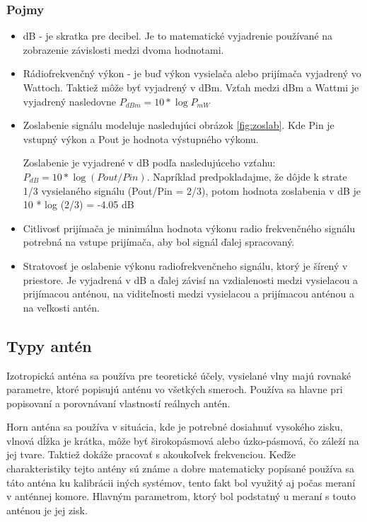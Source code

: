 \documentclass[11pt,twoside,a4paper]{book}
\begin{document}
\subsubsection{Pojmy}
\begin{itemize}
 \item dB - je skratka pre decibel. Je to matematické vyjadrenie používané na zobrazenie závislosti medzi dvoma hodnotami. 
 \item Rádiofrekvenčný výkon - je buď výkon vysielača alebo prijímača vyjadrený vo Wattoch. Taktiež môže byť vyjadrený v dBm. Vzťah medzi dBm a Wattmi je vyjadrený nasledovne $P_{dBm} = 10 * \log P_{mW}$
 \item Zoslabenie signálu modeluje nasledujúci obrázok \ref{fig:zoslab}. Kde Pin je vstupný výkon a Pout je hodnota výstupného výkonu.

 Zoslabenie je vyjadrené v dB podľa nasledujúceho vzťahu: $P_{dB} = 10 * \log(Pout / Pin)$. Napríklad predpokladajme, že dôjde k strate 1/3 vysielaného signálu (Pout/Pin = 2/3), potom hodnota zoslabenia v dB je 10 * log (2/3) = -4.05 dB
 
\item Citlivosť prijímača je minimálna hodnota výkonu radio frekvenčného signálu potrebná na vstupe prijímača, aby bol signál ďalej spracovaný. 

 \item Stratovosť je oslabenie výkonu radiofrekvenčneho signálu, ktorý je šírený v priestore. Je vyjadrená v dB a ďalej závisí na vzdialenosti medzi vysielacou a prijímacou anténou, na viditeľnosti medzi vysielacou a prijímacou anténou a na veľkosti antén.
\end{itemize}

\subsection{Typy antén}
\indent Izotropická anténa sa používa pre teoretické účely, vysielané vlny majú rovnaké parametre, ktoré popisujú anténu vo všetkých smeroch. Používa sa hlavne pri popisovaní a porovnávaní vlastností reálnych antén. 


\noindent Horn anténa sa používa v situácia, kde je potrebné dosiahnuť vysokého zisku, vlnová dĺžka je krátka, môže byť širokopásmová alebo úzko-pásmová, čo záleží na jej tvare. Taktiež dokáže pracovať s akoukoľvek frekvenciou. Keďže charakteristiky tejto antény sú známe a dobre matematicky popísané používa sa táto anténa ku kalibrácii iných systémov, tento fakt bol využitý aj počas meraní v anténnej komore. Hlavným parametrom, ktorý bol podstatný u meraní s touto anténou je jej zisk.
\end{document}
